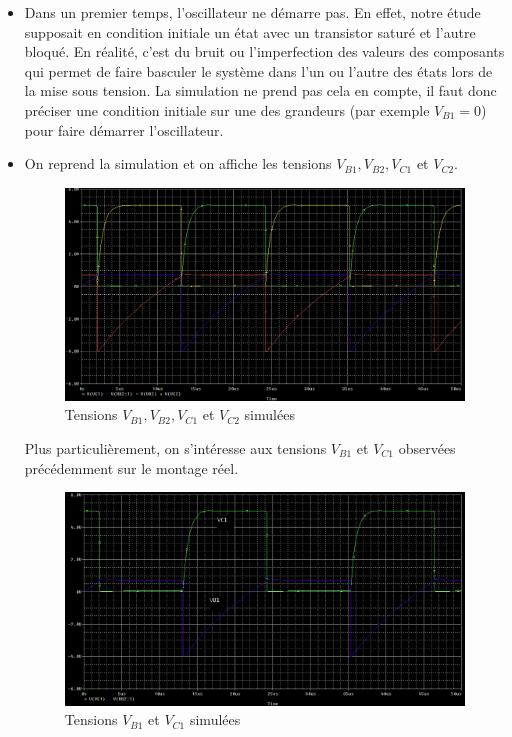 \documentclass[../../Cours_M1.tex]{subfiles}
\begin{document}
\begin{itemize}
\item Dans un premier temps, l'oscillateur ne démarre pas. En effet, notre étude supposait en condition initiale un état avec un transistor saturé et l'autre bloqué. En réalité, c'est du bruit ou l'imperfection des valeurs des composants qui permet de faire basculer le système dans l'un ou l'autre des états lors de la mise sous tension. La simulation ne prend pas cela en compte, il faut donc préciser une condition initiale sur une des grandeurs (par exemple $V_{B1} = 0$) pour faire démarrer l'oscillateur.
\newpage

\item On reprend la simulation et on affiche les tensions $V_{B1},V_{B2},V_{C1}$ et $V_{C2}$.
\begin{figure}[h!]
\centering
\includegraphics[scale=0.3]{AATC/I1sim4.PNG}
\caption{Tensions $V_{B1},V_{B2},V_{C1}$ et $V_{C2}$ simulées}
\end{figure}

Plus particulièrement, on s'intéresse aux tensions $V_{B1}$ et $V_{C1}$ observées précédemment sur le montage réel.
\begin{figure}[h!]
\centering
\includegraphics[scale=0.3]{AATC/I1sim.PNG}
\caption{Tensions $V_{B1}$ et $V_{C1}$ simulées}
\end{figure}


\end{itemize}
\end{document}
